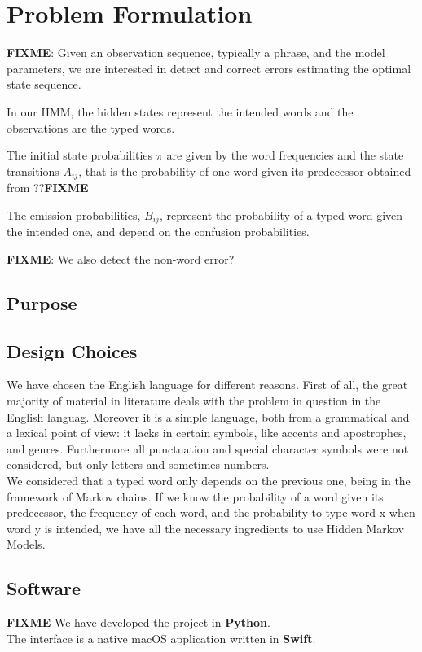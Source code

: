 \chapter{Problem Formulation} %

\textbf{FIXME}: Given an observation sequence, typically a phrase, and the 
model 
parameters, we are interested in detect and correct errors estimating the 
optimal state sequence. 

In our HMM, the hidden states represent the intended words and the 
observations are the typed words. 

The initial state probabilities $\pi$ are given by the word frequencies and 
the state transitions $A_{ij}$, that is the probability of one word given 
its predecessor obtained from ??\textbf{FIXME}

The emission probabilities, $B_{ij}$, represent the probability of a typed 
word given the intended one, and depend on the confusion probabilities.

\textbf{FIXME}: We also detect the non-word error?

\section{Purpose}

\section{Design Choices}

We have chosen the English language for different reasons. First of all, the 
great majority of material in literature deals 
with the problem in question in the English languag. Moreover it is a simple 
language, both from a grammatical and a 
lexical point of view: it lacks in certain symbols, like accents and 
apostrophes, and genres. 
Furthermore all punctuation and special character symbols were not considered, 
but only letters and sometimes numbers. 
\\

We considered that a typed word only depends on the previous one, being 
in the framework of Markov chains. If we know the probability of a word 
given its predecessor, the frequency of each word, and the probability to 
type word x when word y is intended, we have all the necessary ingredients 
to use Hidden Markov Models.

\section{Software}
\textbf{FIXME}
We have developed the project in \textbf{Python}.\\
The interface is a native macOS application written in \textbf{Swift}.